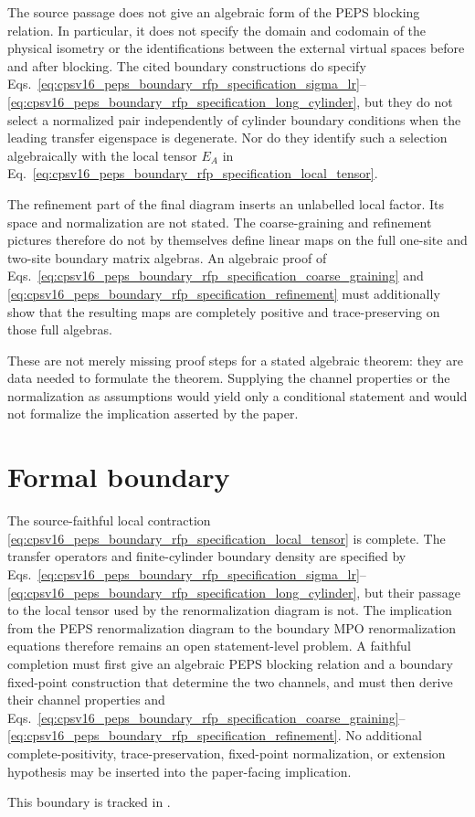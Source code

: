 \documentclass{article}
\begin{document}
The source passage does not give an algebraic form of the PEPS blocking
relation. In particular, it does not specify the domain and codomain of the
physical isometry or the identifications between the external virtual spaces
before and after blocking. The cited boundary constructions do specify
Eqs.~\eqref{eq:cpsv16_peps_boundary_rfp_specification_sigma_lr}--
\eqref{eq:cpsv16_peps_boundary_rfp_specification_long_cylinder}, but they do
not select a normalized pair independently of cylinder boundary conditions
when the leading transfer eigenspace is degenerate. Nor do they identify such
a selection algebraically with the local tensor $E_A$ in
Eq.~\eqref{eq:cpsv16_peps_boundary_rfp_specification_local_tensor}.

The refinement part of the final diagram inserts an unlabelled local factor.
Its space and normalization are not stated. The coarse-graining and refinement
pictures therefore do not by themselves define linear maps on the full
one-site and two-site boundary matrix algebras. An algebraic proof of
Eqs.~\eqref{eq:cpsv16_peps_boundary_rfp_specification_coarse_graining} and
\eqref{eq:cpsv16_peps_boundary_rfp_specification_refinement} must additionally
show that the resulting maps are completely positive and trace-preserving on
those full algebras.

These are not merely missing proof steps for a stated algebraic theorem: they
are data needed to formulate the theorem. Supplying the channel properties or
the normalization as assumptions would yield only a conditional statement and
would not formalize the implication asserted by the paper.

\section{Formal boundary}

The source-faithful local contraction
\eqref{eq:cpsv16_peps_boundary_rfp_specification_local_tensor} is complete.
The transfer operators and finite-cylinder boundary density are specified by
Eqs.~\eqref{eq:cpsv16_peps_boundary_rfp_specification_sigma_lr}--
\eqref{eq:cpsv16_peps_boundary_rfp_specification_long_cylinder}, but their
passage to the local tensor used by the renormalization diagram is not. The
implication from the PEPS renormalization diagram to the boundary MPO
renormalization equations therefore remains an open statement-level problem.
A faithful completion must first give an algebraic PEPS blocking relation and
a boundary fixed-point construction that determine the two channels, and must
then derive their channel properties and
Eqs.~\eqref{eq:cpsv16_peps_boundary_rfp_specification_coarse_graining}--
\eqref{eq:cpsv16_peps_boundary_rfp_specification_refinement}. No additional
complete-positivity, trace-preservation, fixed-point normalization, or
extension hypothesis may be inserted into the paper-facing implication.

This boundary is tracked in .



\end{document}
